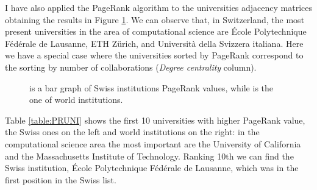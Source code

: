 \documentclass[]{usiinfbachelorproject}
\begin{document}
I have also applied the PageRank algorithm to the universities adjacency matrices obtaining the results in Figure \ref{fig:PRUniversities}.
We can observe that, in Switzerland, the most present universities in the area of computational science are \'{E}cole Polytechnique F\'{e}d\'{e}rale de Lausanne, ETH Z\"{u}rich, and Universit\`{a} della Svizzera italiana. Here we have a special case where the universities sorted by PageRank correspond to the  sorting by number of collaborations (\textit{Degree centrality} column).
\begin{figure}[bt]
	\centering
	\caption{  is a bar graph of Swiss institutions PageRank values, while   is the one of world institutions.}
	\label{fig:PRUniversities}
\end{figure}


Table \ref{table:PRUNI} shows the first 10 universities with higher PageRank value, the Swiss ones on the left and world institutions on the right: in the computational science area the most important are the University of California and the Massachusetts Institute of Technology. Ranking 10th we can find the Swiss institution, \'{E}cole Polytechnique F\'{e}d\'{e}rale de Lausanne, which was in the first position in the Swiss list.
\end{document}
